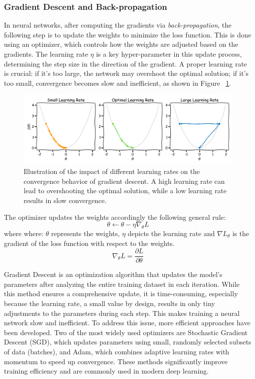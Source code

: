 \subsubsection*{Gradient Descent and Back-propagation}
In neural networks, after computing the gradients via \textit{back-propagation}, the following step is to update the weights to minimize the loss function. This is done using an optimizer, which controls how the weights are adjusted based on the gradients. The learning rate $\eta$ is a key hyper-parameter in this update process, determining the step size in the direction of the gradient. 
A proper learning rate is crucial: if it's too large, the network may overshoot the optimal solution; if it's too small, convergence becomes slow and inefficient, as shown in Figure ~\ref{fig:lr-behaviours}.
\begin{figure}[H]
    \centering
    \includegraphics[width=1\linewidth]{LateX//figs/learning_rate.pdf}
    \caption{Illustration of the impact of different learning rates on the convergence behavior of gradient descent. A high learning rate can lead to overshooting the optimal solution, while a low learning rate results in slow convergence.}
    \label{fig:lr-behaviours}
\end{figure}

The optimizer updates the weights accordingly the following general rule:
\begin{equation}
    \theta \leftarrow \theta - \eta \nabla_\theta L
\end{equation}
where where: $\theta$ represents the weights, $\eta$ depicts the learning rate and $\nabla L_\theta$ is the gradient of the loss function with respect to the weights. 
\begin{equation}
    \nabla_\theta L = \frac{\partial L}{\partial \theta}
\end{equation}

Gradient Descent is an optimization algorithm that updates the model's parameters after analyzing the entire training dataset in each iteration. While this method ensures a comprehensive update, it is time-consuming, especially because the learning rate, a small value by design, results in only tiny adjustments to the parameters during each step. This makes training a neural network slow and inefficient. To address this issue, more efficient approaches have been developed. Two of the most widely used optimizers are Stochastic Gradient Descent (SGD), which updates parameters using small, randomly selected subsets of data (batches), and Adam, which combines adaptive learning rates with momentum to speed up convergence. These methods significantly improve training efficiency and are commonly used in modern deep learning.

